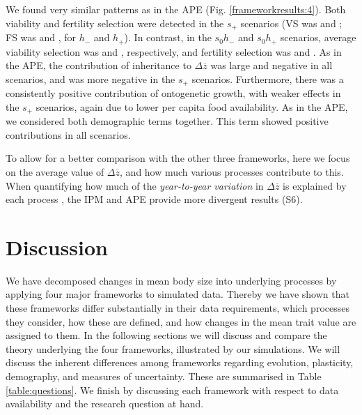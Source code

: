 We found very similar patterns as in the APE (Fig. \ref{frameworkresults:4}). Both viability and fertility selection were detected in the $s_+$ scenarios (VS was  and ; FS was  and , for $h_{-}$ and $h_+$). In contrast, in the $s_0 h_-$ and $s_0 h_+$ scenarios, average viability selection was  and , respectively, and fertility selection was  and .  As in the APE, the contribution of inheritance to $\Delta \overline z$ was large and negative in all scenarios, and was more negative in the $s_+$ scenarios. Furthermore, there was a consistently positive contribution of ontogenetic growth, with weaker effects in the $s_+$ scenarios, again due to lower per capita food availability. As in the APE, we considered both demographic terms together. This term showed positive contributions in all scenarios.

To allow for a better comparison with the other three frameworks, here we focus on the average value of $\Delta \overline z$, and how much various processes contribute to this. When quantifying how much of the \emph{year-to-year variation} in $\Delta \overline z$ is explained by each process \parencite[as for example in][]{Ozgul2009}, the IPM and APE provide more divergent results (S6).


\section{Discussion}
We have decomposed changes in mean body size into underlying processes by applying four major  frameworks to simulated data. Thereby we have shown that these frameworks differ substantially in their data requirements, which processes they consider, how these are defined, and how changes in the mean trait value are assigned to them. In the following sections we will discuss and compare the theory underlying the four frameworks, illustrated by our simulations. We will discuss the inherent differences among frameworks regarding evolution, plasticity, demography, and measures of uncertainty. These are summarised in Table \ref{table:questions}. We finish by discussing each framework with respect to data availability and the research question at hand.


